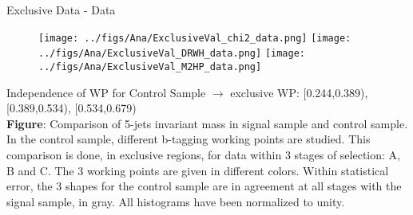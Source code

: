 \begin{frame}{Exclusive Data - Data}
\vspace{-.2cm}
\begin{figure}[!Hhtbp]
  \begin{center}
    \texttt{[image: ../figs/Ana/ExclusiveVal\_chi2\_data.png]}
    \texttt{[image: ../figs/Ana/ExclusiveVal\_DRWH\_data.png]}
    \texttt{[image: ../figs/Ana/ExclusiveVal\_M2HP\_data.png]}
  \end{center}
\end{figure}

\vspace{-.2cm}
    \begin{block}{}\tiny
      Independence of WP for Control Sample $\to$ exclusive WP: [0.244,0.389), [0.389,0.534), [0.534,0.679)\\
      \textbf{Figure}: Comparison of 5-jets invariant mass in signal sample and control sample. In the control sample, different b-tagging working points are studied. This comparison is done, in exclusive regions, for data within 3 stages of selection: A, B and C. The 3 working points are given in different colors. Within statistical error, the 3 shapes for the control sample are in agreement at all stages with the signal sample, in gray. All histograms have been normalized to unity.
    \end{block}

\end{frame}

